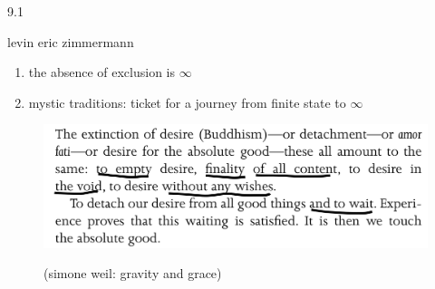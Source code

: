 \documentclass[12pt,a4paper,ngerman]{article}
\begin{document}

{ \Large 9.1 }

\vspace{0.5cm}

{ \large levin eric zimmermann }

\vspace{0.25cm}


\begin{enumerate}

    \item{the absence of exclusion is $\infty$}


    \item{mystic traditions: ticket for a journey from finite state to $\infty$}

\end{enumerate}



\begin{figure}[h]
    \begin{center}
        \includegraphics[scale=0.28]{pictures/weil-quote-annotated.png}
    \end{center}
    \begin{center}
        (simone weil: gravity and grace)
    \end{center}
\end{figure}
\end{document}
